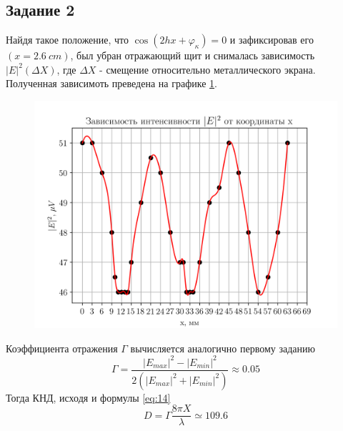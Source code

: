 \subsection{Задание 2}
Найдя такое положение, что $\cos (2 h x +\varphi_{\kappa} )=0$ и зафиксировав его $(x = 2.6~cm)$, был убран отражающий щит и снималась
зависимость $|E|^2(\Delta X)$, где $\Delta X$ - смещение относительно металлического экрана. Полученная зависимоть
преведена на графике \ref{fig:exp:2}.
\begin{figure}[h!]
    \centering
    \includegraphics[width = 0.9\linewidth]{graphs/data1.png}
    \label{fig:exp:2}
    \caption{}
\end{figure}

Коэффициента отражения $\Gamma$ вычисляется аналогично первому заданию
\begin{equation}
    \Gamma = \frac{|E_{max}|^2-|E_{min}|^2}{2( |E_{max}|^2+|E_{min}|^2 )} \approx 0.05
\end{equation}
Тогда КНД, исходя и формулы \eqref{eq:14}
\begin{equation}
    D = \Gamma \frac{8 \pi X}{\lambda} \simeq 109.6    
\end{equation}

